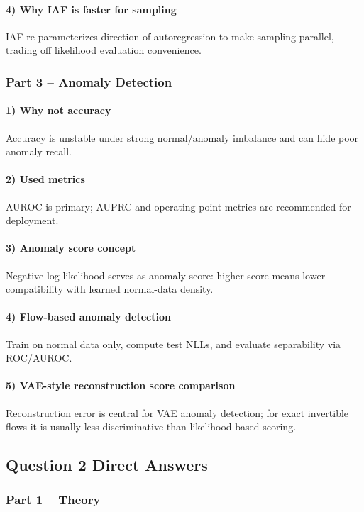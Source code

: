 \documentclass[conference]{IEEEtran}
\begin{document}
\paragraph{4) Why IAF is faster for sampling}
IAF re-parameterizes direction of autoregression to make sampling parallel, trading off likelihood evaluation convenience.

\subsubsection{Part 3 -- Anomaly Detection}
\paragraph{1) Why not accuracy}
Accuracy is unstable under strong normal/anomaly imbalance and can hide poor anomaly recall.

\paragraph{2) Used metrics}
AUROC is primary; AUPRC and operating-point metrics are recommended for deployment.

\paragraph{3) Anomaly score concept}
Negative log-likelihood serves as anomaly score: higher score means lower compatibility with learned normal-data density.

\paragraph{4) Flow-based anomaly detection}
Train on normal data only, compute test NLLs, and evaluate separability via ROC/AUROC.

\paragraph{5) VAE-style reconstruction score comparison}
Reconstruction error is central for VAE anomaly detection; for exact invertible flows it is usually less discriminative than likelihood-based scoring.

\subsection{Question 2 Direct Answers}
\subsubsection{Part 1 -- Theory}
\end{document}
